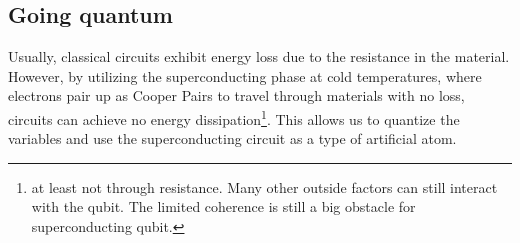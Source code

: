 
\subsection{Going quantum}
 Usually, classical circuits exhibit energy loss due to the resistance in the material. However, by utilizing the superconducting phase at cold temperatures, where electrons pair up as Cooper Pairs to travel through materials with no loss, circuits can achieve no energy dissipation\footnote{at least not through resistance. Many other outside factors can still interact with the qubit. The limited coherence is still a big obstacle for superconducting qubit.}. This allows us to quantize the variables and use the superconducting circuit as a type of artificial atom. \cite{gennes_superconductivity_1966}

